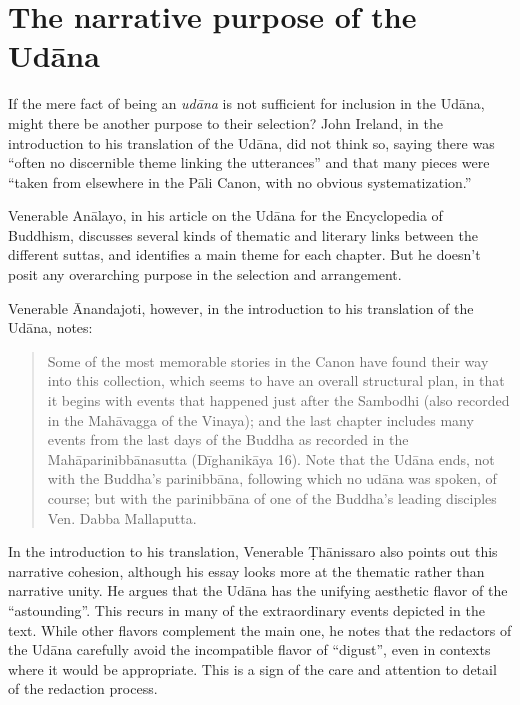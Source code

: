 \documentclass[12pt,openany]{book}%
\begin{document}
\section*{The narrative purpose of the \textsanskrit{Udāna}}

If the mere fact of being an \textit{\textsanskrit{udāna}} is not sufficient for inclusion in the \textsanskrit{Udāna}, might there be another purpose to their selection? John Ireland, in the introduction to his translation of the \textsanskrit{Udāna}, did not think so, saying there was “often no discernible theme linking the utterances” and that many pieces were “taken from elsewhere in the \textsanskrit{Pāli} Canon, with no obvious systematization.”

Venerable \textsanskrit{Anālayo}, in his article on the \textsanskrit{Udāna} for the Encyclopedia of Buddhism, discusses several kinds of thematic and literary links between the different suttas, and identifies a main theme for each chapter. But he doesn’t posit any overarching purpose in the selection and arrangement.

Venerable Ānandajoti, however, in the introduction to his translation of the \textsanskrit{Udāna}, notes:

\begin{quotation}%
Some of the most memorable stories in the Canon have found their way into this collection, which seems to have an overall structural plan, in that it begins with events that happened just after the Sambodhi (also recorded in the \textsanskrit{Mahāvagga} of the Vinaya); and the last chapter includes many events from the last days of the Buddha as recorded in the \textsanskrit{Mahāparinibbānasutta} (\textsanskrit{Dīghanikāya} 16). Note that the \textsanskrit{Udāna} ends, not with the Buddha’s \textsanskrit{parinibbāna}, following which no \textsanskrit{udāna} was spoken, of course; but with the \textsanskrit{parinibbāna} of one of the Buddha’s leading disciples Ven. Dabba Mallaputta.

%
\end{quotation}

In the introduction to his translation, Venerable \textsanskrit{Ṭhānissaro} also points out this narrative cohesion, although his essay looks more at the thematic rather than narrative unity. He argues that the \textsanskrit{Udāna} has the unifying aesthetic flavor of the “astounding”. This recurs in many of the extraordinary events depicted in the text. While other flavors complement the main one, he notes that the redactors of the \textsanskrit{Udāna} carefully avoid the incompatible flavor of “digust”, even in contexts where it would be appropriate. This is a sign of the care and attention to detail of the redaction process.
\end{document}

